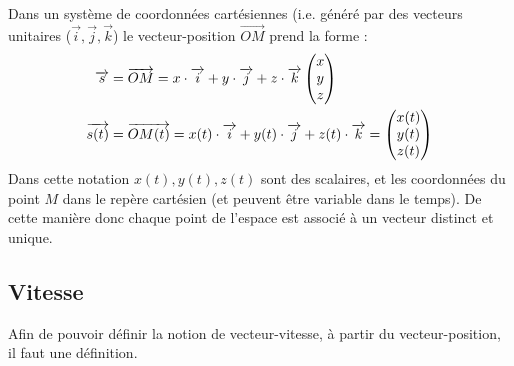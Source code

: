\documentclass[11pt,a4paper]{article}
\begin{document}
\endgroup

\newpage
Dans un système de coordonnées cartésiennes (i.e. généré par des vecteurs unitaires ($\Vec{i}, \Vec{j}, \Vec{k}$) le vecteur-position $\overrightarrow{OM}$ prend la forme :
\begin{align*}
    \overrightarrow{s} &= \overrightarrow{OM} = x\cdot \overrightarrow{i} + y\cdot\overrightarrow{j} + z\cdot\overrightarrow{k}  
    \begin{pmatrix} x \\ y \\ z \end{pmatrix} \\
    \overrightarrow{s(t)} &= \overrightarrow{OM(t)} = x(t)\cdot \overrightarrow{i} + y(t)\cdot\overrightarrow{j} + z(t)\cdot\overrightarrow{k} = 
    \begin{pmatrix} x(t) \\ y(t) \\ z(t) \end{pmatrix} \\
\end{align*}
Dans cette notation $x(t), y(t), z(t)$ sont des scalaires, et les coordonnées du point $M$ dans le repère cartésien (et peuvent être variable dans le temps). 
De cette manière donc chaque point de l'espace est associé à un vecteur distinct et unique. 

\subsection{Vitesse}
Afin de pouvoir définir la notion de vecteur-vitesse, à partir du vecteur-position, il faut une définition. 
\end{document}
